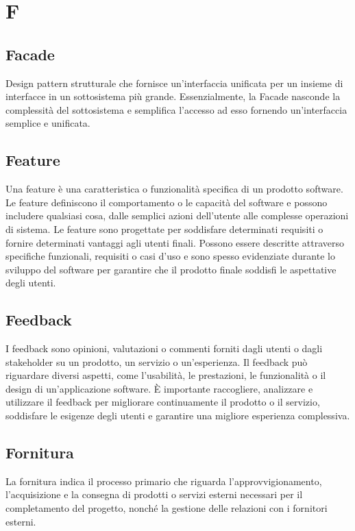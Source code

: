 \section*{F} 
\subsection*{Facade} 
Design pattern strutturale che fornisce un'interfaccia unificata per un insieme di interfacce in un sottosistema più grande. Essenzialmente, la Facade nasconde la complessità del sottosistema e semplifica l'accesso ad esso fornendo un'interfaccia semplice e unificata.
\subsection*{Feature} 
Una feature è una caratteristica o funzionalità specifica di un prodotto software. Le feature definiscono il comportamento o le capacità del software e possono includere qualsiasi cosa, dalle semplici azioni dell'utente alle complesse operazioni di sistema. Le feature sono progettate per soddisfare determinati requisiti o fornire determinati vantaggi agli utenti finali. Possono essere descritte attraverso specifiche funzionali, requisiti o casi d'uso e sono spesso evidenziate durante lo sviluppo del software per garantire che il prodotto finale soddisfi le aspettative degli utenti.
\subsection*{Feedback} 
I feedback sono opinioni, valutazioni o commenti forniti dagli utenti o dagli stakeholder su un prodotto, un servizio o un'esperienza. Il feedback può riguardare diversi aspetti, come l'usabilità, le prestazioni, le funzionalità o il design di un'applicazione software. È importante raccogliere, analizzare e utilizzare il feedback per migliorare continuamente il prodotto o il servizio, soddisfare le esigenze degli utenti e garantire una migliore esperienza complessiva.
\subsection*{Fornitura} 
La fornitura indica il processo primario che riguarda l'approvvigionamento, l'acquisizione e la consegna di prodotti o servizi esterni necessari per il completamento del progetto, nonché la gestione delle relazioni con i fornitori esterni.
